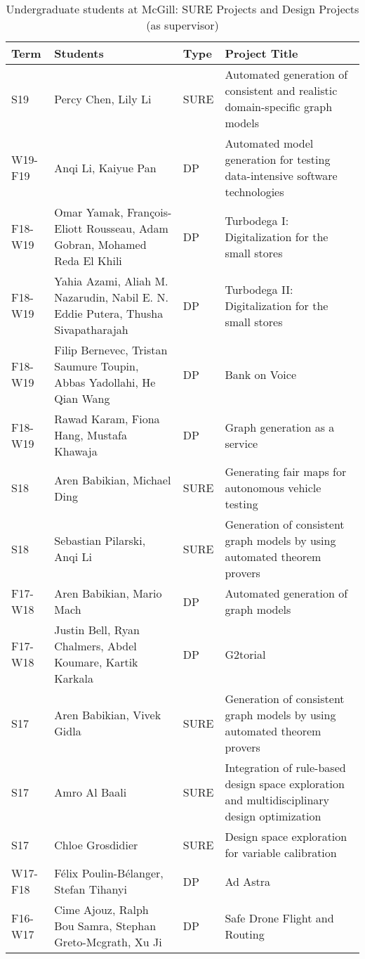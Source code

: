 \documentclass{xetexCV}
\begin{document}
\begin{table}[htbp]
\begin{tabular}{@{}lp{6cm}lp{6cm}@{}}
\toprule
\textbf{Term} & \textbf{Students} & \textbf{Type} & \textbf{Project Title} \\ \midrule
S19 & Percy Chen, Lily Li & SURE& Automated generation of consistent and realistic domain-specific graph models\\
W19-F19 & Anqi Li, Kaiyue Pan & DP  & Automated model generation for testing data-intensive software technologies \\
F18-W19 & Omar Yamak, François-Eliott Rousseau, Adam Gobran, Mohamed Reda El Khili & DP  & Turbodega I: Digitalization for the small stores\\
F18-W19 & Yahia Azami, Aliah M. Nazarudin, Nabil E. N. Eddie Putera, Thusha Sivapatharajah & DP  & Turbodega II: Digitalization for the small stores\\
F18-W19 & Filip Bernevec, Tristan Saumure Toupin, Abbas Yadollahi, He Qian Wang & DP  & Bank on Voice \\
F18-W19 & Rawad Karam, Fiona Hang, Mustafa Khawaja& DP  & Graph generation as a service\\
S18 & Aren Babikian, Michael Ding & SURE & Generating fair maps for autonomous vehicle testing\\
S18 & Sebastian Pilarski, Anqi Li& SURE & Generation of consistent graph models by using automated theorem provers\\
F17-W18 & Aren Babikian, Mario Mach & DP  & Automated generation of graph models\\
F17-W18 & Justin Bell, Ryan Chalmers, Abdel Koumare, Kartik Karkala & DP & G2torial\\
S17 & Aren Babikian, Vivek Gidla & SURE & Generation of consistent graph models by using automated theorem provers\\
S17 & Amro Al Baali & SURE & Integration of rule-based design space exploration and multidisciplinary design optimization\\
S17 & Chloe Grosdidier & SURE & Design space exploration for variable calibration\\
W17-F18 & F\'elix Poulin-B\'elanger, Stefan Tihanyi & DP  & Ad Astra\\
F16-W17 & Cime Ajouz, Ralph Bou Samra, Stephan Greto-Mcgrath, Xu Ji & DP  & Safe Drone Flight and Routing\\
\midrule
\bottomrule
\end{tabular}
\caption{Undergraduate students at McGill: SURE Projects and Design Projects (as supervisor)}
\label{tab:ug-supervised}
\end{table}
\end{document}
